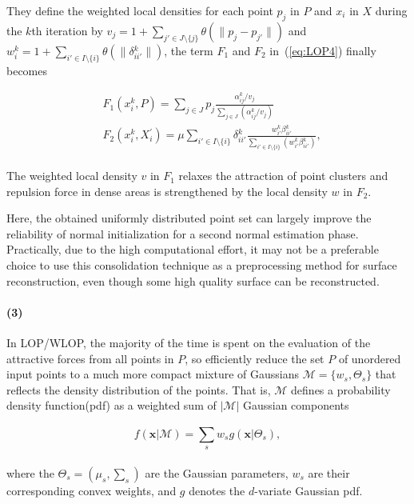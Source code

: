 They define the weighted local densities for each point $p_{j}$ in $P$ and $x_{i}$ in $X$ during the $k$th iteration by $v_{j}=1+\sum_{j'\in J\setminus\{j\}}^{}\theta(\|p_{j}-p_{j'}\|)$ and $w{_i^k}=1+\sum_{i'\in I\setminus\{i\}}^{}\theta(\|\delta{_{ii'}^k}\|)$, the term $F_1$ and $F_2$ in~(\ref{eq:LOP4}) finally becomes

\small{
\begin{equation}
 \label{eq:WLOP}
 \begin{split}
 & F_1(x{_i^k},P)=\sum_{j\in J}^{}p_{j}\frac{\alpha{_{ij}^k}/v_{j}}{\sum_{j\in J}^{}(\alpha{_{ij}^k}/v_{j})}\\
 & F_2(x{_i^k},X{_i^{'}})=\mu\sum_{{i'}\in I\setminus\{i\}}^{}\delta{_{ii'}^k}\frac{w{_{i'}^k}\beta{_{ii'}^k}}{\sum_{{i'}\in I\setminus\{i\}}^{}(w{_{i'}^k}\beta{_{ii'}^k})},
 \end{split}
\end{equation}
}
\\
The weighted local density $v$ in $F_1$ relaxes the attraction of point clusters and
repulsion force in dense areas is strengthened by the local density $w$ in $F_2$.

Here, the obtained uniformly distributed point set can largely improve the reliability of normal initialization for a second normal estimation phase.
Practically, due to the high computational effort, it may not be a preferable choice to use this consolidation technique as a preprocessing method for surface reconstruction, even though some high quality surface can be reconstructed.


\paragraph{(3)}
In LOP/WLOP, the majority of the time is spent on the evaluation of the attractive forces from all points in $P$,
so \cite{preiner2014CPF} efficiently reduce the set $P$ of unordered input points to a much more compact mixture of Gaussians $\mathcal{M}=\{w_{s},\Theta_{s}\}$ that reflects the density distribution of the points.
That is, $\mathcal{M}$ defines a probability density function(pdf) as a weighted sum of $|\mathcal{M}|$ Gaussian components

\small{
\begin{equation}
 \label{eq:CLOP1}
 f(\mathbf{x}|\mathcal{M})=\sum_{s}^{}w_{s}g(\mathbf{x}|\Theta_{s}),
\end{equation}
}
\\
where the $\Theta_{s}=(\mu_{s},\sum_{s}^{})$ are the Gaussian parameters,
$w_{s}$ are their corresponding convex weights, and
$g$ denotes the $d$-variate Gaussian pdf.

